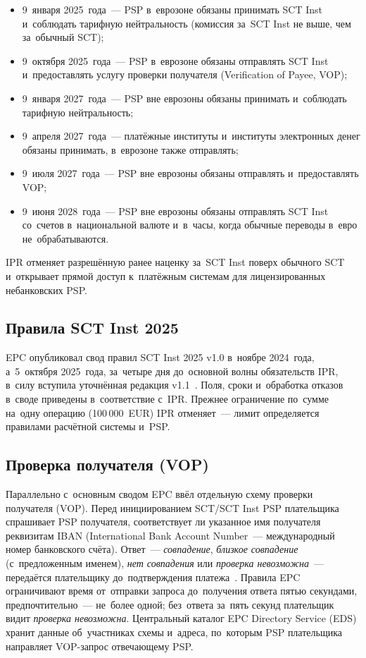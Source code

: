 \begin{itemize}
  \item 9~января 2025~года~--- PSP в~еврозоне обязаны принимать SCT Inst
    и~соблюдать тарифную нейтральность (комиссия за~SCT Inst не выше, чем
    за~обычный SCT);
  \item 9~октября 2025~года~--- PSP в~еврозоне обязаны отправлять SCT Inst
    и~предоставлять услугу проверки получателя (Verification of Payee, VOP);
  \item 9~января 2027~года~--- PSP вне еврозоны обязаны принимать и~соблюдать
    тарифную нейтральность;
  \item 9~апреля 2027~года~--- платёжные институты и~институты электронных
    денег обязаны принимать, в~еврозоне также отправлять;
  \item 9~июля 2027~года~--- PSP вне еврозоны обязаны отправлять
    и~предоставлять VOP;
  \item 9~июня 2028~года~--- PSP вне еврозоны обязаны отправлять SCT Inst
    со~счетов в~национальной валюте и~в~часы, когда обычные переводы в~евро
    не~обрабатываются.
\end{itemize}

IPR отменяет разрешённую ранее наценку за~SCT Inst поверх обычного SCT
и~открывает прямой доступ к~платёжным системам для лицензированных небанковских
PSP.

\subsection*{Правила SCT Inst 2025}\label{subsec:sepa-rulebook}

EPC опубликовал свод правил SCT Inst 2025 v1.0 в~ноябре 2024~года, а~5~октября 2025~года, за~четыре дня до~основной волны обязательств IPR, в~силу вступила
уточнённая редакция v1.1~\cite{epc-sct-inst-rulebook-2025}. Поля,
сроки и~обработка отказов в~своде приведены в~соответствие с~IPR. Прежнее
ограничение по~сумме на~одну операцию (100\,000~EUR) IPR отменяет~--- лимит
определяется правилами расчётной системы и~PSP.

\subsection*{Проверка получателя (VOP)}\label{subsec:sepa-vop}

Параллельно с~основным сводом EPC ввёл отдельную схему проверки получателя
(VOP). Перед инициированием SCT/SCT Inst PSP плательщика спрашивает PSP
получателя, соответствует ли указанное имя получателя реквизитам IBAN
(International Bank Account Number~--- международный номер банковского счёта).
Ответ~--- \emph{совпадение}, \emph{близкое совпадение} (с~предложенным именем),
\emph{нет совпадения} или \emph{проверка невозможна}~--- передаётся плательщику
до~подтверждения платежа~\cite{epc-vop}. Правила EPC ограничивают время
от~отправки запроса до~получения ответа пятью секундами, предпочтительно~---
не~более одной; без~ответа за~пять секунд плательщик видит \emph{проверка
невозможна}. Центральный каталог EPC Directory Service (EDS) хранит данные
об~участниках схемы и~адреса, по~которым PSP плательщика направляет
VOP-запрос отвечающему PSP.

